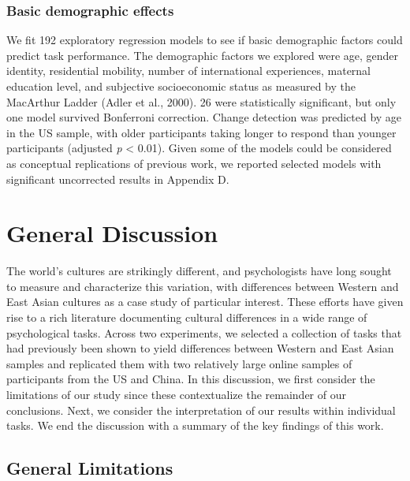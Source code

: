 \documentclass[
  man,floatsintext]{apa6}
\begin{document}
\hypertarget{basic-demographic-effects}{%
\subsubsection{Basic demographic effects}\label{basic-demographic-effects}}

We fit 192 exploratory regression models to see if basic demographic factors could predict task performance. The demographic factors we explored were age, gender identity, residential mobility, number of international experiences, maternal education level, and subjective socioeconomic status as measured by the MacArthur Ladder (Adler et al., 2000). 26 were statistically significant, but only one model survived Bonferroni correction. Change detection was predicted by age in the US sample, with older participants taking longer to respond than younger participants (adjusted \emph{p} \textless{} 0.01). Given some of the models could be considered as conceptual replications of previous work, we reported selected models with significant uncorrected results in Appendix D.

\hypertarget{general-discussion}{%
\section{General Discussion}\label{general-discussion}}

The world's cultures are strikingly different, and psychologists have long sought to measure and characterize this variation, with differences between Western and East Asian cultures as a case study of particular interest. These efforts have given rise to a rich literature documenting cultural differences in a wide range of psychological tasks. Across two experiments, we selected a collection of tasks that had previously been shown to yield differences between Western and East Asian samples and replicated them with two relatively large online samples of participants from the US and China. In this discussion, we first consider the limitations of our study since these contextualize the remainder of our conclusions. Next, we consider the interpretation of our results within individual tasks. We end the discussion with a summary of the key findings of this work.

\hypertarget{general-limitations}{%
\subsection{General Limitations}\label{general-limitations}}
\end{document}
